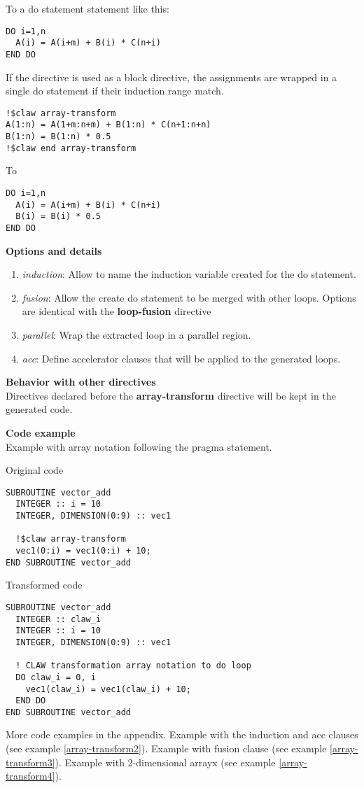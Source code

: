 To a do statement statement like this:

\begin{lstlisting}
DO i=1,n
  A(i) = A(i+m) + B(i) * C(n+i)
END DO
\end{lstlisting}

If the directive is used as a block directive, the assignments are wrapped in
a single do statement if their induction range match.

\begin{lstlisting}
!$claw array-transform
A(1:n) = A(1+m:n+m) + B(1:n) * C(n+1:n+n)
B(1:n) = B(1:n) * 0.5
!$claw end array-transform
\end{lstlisting}

To

\begin{lstlisting}
DO i=1,n
  A(i) = A(i+m) + B(i) * C(n+i)
  B(i) = B(i) * 0.5
END DO
\end{lstlisting}


\textbf{Options and details}
\begin{enumerate}
\item \textit{induction}: Allow to name the induction variable created for the
do statement.
\item \textit{fusion}: Allow the create do statement to be merged with other
loops. Options
are identical with the \textbf{loop-fusion} directive
\item \textit{parallel}: Wrap the extracted loop in a parallel region.
\item \textit{acc}: Define accelerator clauses that will be applied to the
generated loops.
\end{enumerate}

\textbf{Behavior with other directives}\\
Directives declared before the \textbf{array-transform} directive will be kept
in the generated code.

\textbf{Code example}\\
\label{array-transform1}
Example with array notation following the pragma statement.

Original code
\begin{lstlisting}
SUBROUTINE vector_add
  INTEGER :: i = 10
  INTEGER, DIMENSION(0:9) :: vec1

  !$claw array-transform
  vec1(0:i) = vec1(0:i) + 10;
END SUBROUTINE vector_add
\end{lstlisting}

Transformed code
\begin{lstlisting}
SUBROUTINE vector_add
  INTEGER :: claw_i
  INTEGER :: i = 10
  INTEGER, DIMENSION(0:9) :: vec1

  ! CLAW transformation array notation to do loop
  DO claw_i = 0, i
    vec1(claw_i) = vec1(claw_i) + 10;
  END DO
END SUBROUTINE vector_add
\end{lstlisting}

More code examples in the appendix. Example with the induction and acc clauses
(see example \ref{array-transform2}). Example with fusion clause (see example
\ref{array-transform3}). Example with 2-dimensional arrayx (see example
\ref{array-transform4}).
